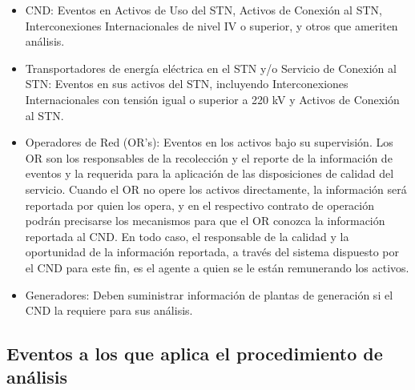 \documentclass[a5paper]{book}%
\begin{document}
\begin{itemize}
  
\item CND: Eventos en Activos de Uso del STN, Activos de Conexión al STN, Interconexiones Internacionales de nivel IV o superior, y otros que ameriten análisis.
    
  \item Transportadores de energía eléctrica en el \ac{STN} y/o Servicio de Conexión al \ac{STN}: Eventos en sus activos del \ac{STN}, incluyendo Interconexiones Internacionales con tensión igual o superior a 220 kV y Activos de Conexión al \ac{STN}.
  
  \item Operadores de Red (OR's): Eventos en los activos bajo su supervisión. Los OR son los responsables de la recolección y el reporte de la información de eventos y la requerida para la aplicación de las disposiciones de calidad del servicio. Cuando el OR no opere los activos directamente, la información será reportada por quien los opera, y en el respectivo contrato de operación podrán precisarse los mecanismos para que el OR conozca la información reportada al CND. En todo caso, el responsable de la calidad y la oportunidad de la información reportada, a través del sistema dispuesto por el CND para este fin, es el agente a quien se le están remunerando los activos.
    
  \item Generadores: Deben suministrar información de plantas de generación si el \ac{CND} la requiere para sus análisis.

\end{itemize}



\subsection{Eventos a los que aplica el procedimiento de análisis}
\end{document}
